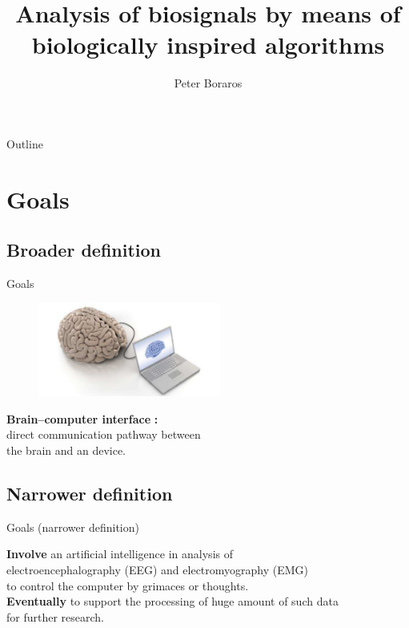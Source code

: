 \documentclass{beamer}
\title[Analysis of biosignals]{Analysis of biosignals by means of\\ biologically inspired algorithms}
\author{Peter Boraros}
\begin{document}
\begin{frame}
\titlepage
\end{frame}


\begin{frame}{Outline}
\tableofcontents %
\end{frame}

\section{Goals}

\subsection*{Broader definition}
\begin{frame}{Goals}
	\begin{figure}[h]
		\centering
		\includegraphics[width=60mm]{brain_computer}
		\label{filters}
	\end{figure}	
	\pause
	\begin{center}
		\textbf{Brain–computer interface}%
		\pause
		\textbf{:}\\
		direct communication pathway between\\ the brain and an device.
	\end{center}
\end{frame}

\subsection*{Narrower definition}
\begin{frame}{Goals (narrower definition) }
\begin{center}
\textbf{Involve} \pause 
an artificial intelligence  in analysis of
\\electroencephalography (EEG) and electromyography (EMG) \pause
\\to control the computer by grimaces or thoughts.\pause
\\\textbf{Eventually} \pause
to support the processing of huge amount of such data 
\\for further research.
\end{center}
\end{frame}
\end{document}
